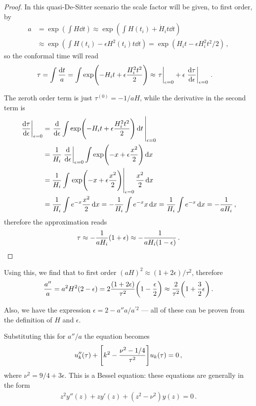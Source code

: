 \documentclass[main.tex]{subfiles}
\begin{document}
\begin{proof}
In this quasi-De-Sitter scenario the scale factor will be given, to first order, by 
%
\begin{align}
a &= \exp(\int H \dd{t}) \approx \exp(\int H(t_i) + \dot{H}_i t \dd{t})  \\
&\approx \exp(\int H(t_i) - \epsilon H^2(t_i) t \dd{t} ) = \exp(H_i t - \epsilon H_i^2 t^2 /2)
\,,
\end{align}
%
so the conformal time will read 
%
\begin{align}
\tau &= \int \frac{ \dd{t}}{a} = \int \exp(- H_i t + \epsilon \frac{H_i^2t^2}{2}) \approx \eval{\tau }_{\epsilon =0} + \epsilon \eval{\dv{\tau }{\epsilon }}_{\epsilon = 0}
\,.
\end{align}

The zeroth order term is just \(\tau^{(0)} = - 1/ aH\), while the derivative in the second term is 
%
\begin{align}
\eval{\dv{\tau }{\epsilon }}_{\epsilon = 0} &= \eval{\dv{}{\epsilon } \int \exp(- H_i t + \epsilon \frac{H_i^2t^2}{2}) \dd{t}}_{\epsilon =0}   \\
&= \frac{1}{H_i} \eval{\dv{}{\epsilon }}_{\epsilon = 0} \int \exp(-x + \epsilon \frac{x^2}{2}) \dd{x}  \\
&= \frac{1}{H_i} \int \eval{\exp(- x + \epsilon \frac{x^2}{2})}_{\epsilon = 0 } \frac{x^2}{2} \dd{x}  \\
&= \frac{1}{H_i} \int e^{-x} \frac{x^2}{2} \dd{x} 
= - \frac{1}{H_i} \int e^{-x} x \dd{x} = \frac{1}{H_i} \int e^{-x} \dd{x} = - \frac{1}{a H_i}
\,,
\end{align}
%
therefore the approximation reads 
%
\begin{align}
\tau \approx - \frac{1}{a H_i} \qty(1 + \epsilon ) \approx - \frac{1}{a H_i (1 - \epsilon )} 
\,.
\end{align}
\end{proof}

Using this, we find that to first order \((aH)^2 \approx (1 + 2 \epsilon ) / \tau^2\), therefore
%
\begin{align}
\frac{a''}{a} = a^2 H^2 (2- \epsilon ) 
=2 \frac{(1 + 2 \epsilon)}{\tau^2} \qty(1 - \frac{\epsilon}{2})
\approx \frac{2}{\tau^2} \qty(1 + \frac{3}{2} \epsilon )
\,.
\end{align}

Also, we have the expression \(\epsilon = 2 - a'' a / a^{\prime 2}\) --- all of these can be proven from the definition of \(H\) and \(\epsilon \).

Substituting this for \(a'' /a\) the equation becomes 
%
\begin{align}
u''_k(\tau ) + \qty[k^2 - \frac{\nu^2 - 1/4}{\tau^2}] u_k (\tau )= 0 
\,,
\end{align}
%
where \(\nu^2 = 9/4 + 3 \epsilon \). 
This is a Bessel equation: these equations are generally in the form 
%
\begin{align}
z^2 y'' (z) + z y' (z) + (z^2 - \nu^2) y(z) = 0
\,.
\end{align}
\end{document}
